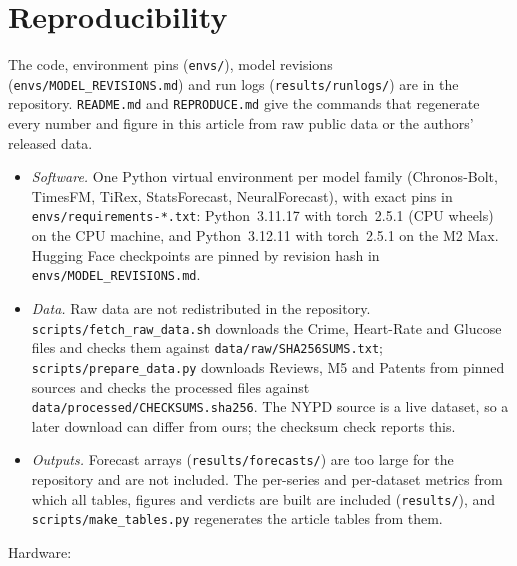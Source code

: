 \section{Reproducibility}\label{sec:repro}
The code, environment pins (\texttt{envs/}), model revisions (\texttt{envs/MODEL\_REVISIONS.md}) and run logs
(\texttt{results/runlogs/}) are in the repository. \texttt{README.md} and \texttt{REPRODUCE.md} give the commands
that regenerate every number and figure in this article from raw public data or the authors' released data.
\begin{itemize}
\item \emph{Software.} One Python virtual environment per model family (Chronos-Bolt, TimesFM, TiRex, StatsForecast,
NeuralForecast), with exact pins in \texttt{envs/requirements-*.txt}: Python~3.11.17 with torch~2.5.1 (CPU wheels)
on the CPU machine, and Python~3.12.11 with torch~2.5.1 on the M2 Max. Hugging Face checkpoints are pinned by
revision hash in \texttt{envs/MODEL\_REVISIONS.md}.
\item \emph{Data.} Raw data are not redistributed in the repository. \texttt{scripts/fetch\_raw\_data.sh} downloads
the Crime, Heart-Rate and Glucose files and checks them against \texttt{data/raw/SHA256SUMS.txt};
\texttt{scripts/prepare\_data.py} downloads Reviews, M5 and Patents from pinned sources and checks the processed
files against \texttt{data/processed/CHECKSUMS.sha256}. The NYPD source is a live dataset, so a later download
can differ from ours; the checksum check reports this.
\item \emph{Outputs.} Forecast arrays (\texttt{results/forecasts/}) are too large for the repository and are not
included. The per-series and per-dataset metrics from which all tables, figures and verdicts are built are
included (\texttt{results/}), and \texttt{scripts/make\_tables.py} regenerates the article tables from them.
\end{itemize}
Hardware:
